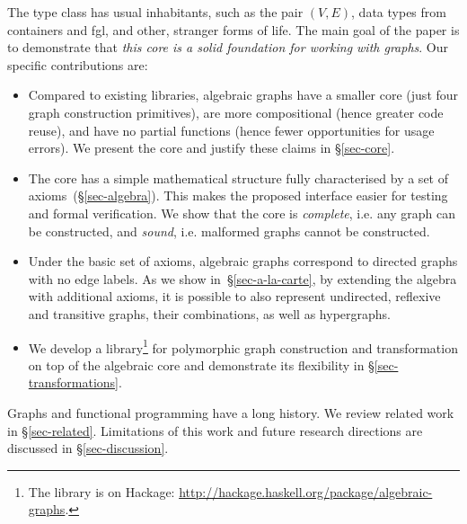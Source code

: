 \noindent
The type class has usual inhabitants, such as the pair $(V,E)$, data types from
\textsf{containers} and \textsf{fgl}, and other, stranger forms of life.
The main goal of the paper is to demonstrate that \emph{this core is a solid
foundation for working with graphs}. Our specific contributions are:
\begin{itemize}
  \item Compared to existing libraries, algebraic graphs have a smaller
  core (just four graph construction primitives), are more compositional
  (hence greater code reuse), and have no partial functions (hence fewer
  opportunities for usage errors). We present the core and justify these claims
  in \S\ref{sec-core}.

  \item The core has a simple mathematical structure fully characterised
  by a set of axioms~(\S\ref{sec-algebra}). This makes the
  proposed interface easier for testing and formal verification. We show that
  the core is \emph{complete}, i.e. any graph can be constructed, and \emph{sound},
  i.e. malformed graphs cannot be constructed.

  \item Under the basic set of axioms, algebraic graphs correspond to directed
  graphs with no edge labels. As we show in~\S\ref{sec-a-la-carte}, by extending
  the algebra
  with additional axioms, it is possible to also represent undirected, reflexive
  and transitive graphs, their combinations, as well as hypergraphs.

  \item We develop a library\footnote{The library is on Hackage:
  \url{http://hackage.haskell.org/package/algebraic-graphs}.} for polymorphic graph
  construction and transformation on top of the algebraic core and
  demonstrate its flexibility in \S\ref{sec-transformations}.
\end{itemize}

Graphs and functional programming have a long history. We review related
work in \S\ref{sec-related}. Limitations of this work and future
research directions are discussed in \S\ref{sec-discussion}.

